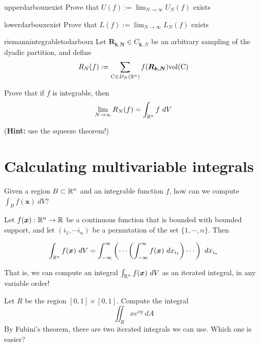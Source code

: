 \begin{problem}{upperdarbouxexist}
    Prove that $U(f) := \lim_{N \to \infty} U_N(f)$ exists 
\end{problem}

\begin{problem}{lowerdarbouxexist}
    Prove that $L(f) := \lim_{N \to \infty} L_N(f)$ exists 
\end{problem}

\begin{problem}{riemannintegrabletodarboux}
    Let $\bm{R_{k,N}} \in C_{\bm{k},N}$ be an arbitrary sampling of the dyadic partition, and define 
    $$R_N(f) := \sum_{C \in D_N(\mathbb{R}^n)} f(\bm{R_{k,N}}) \textnormal{vol(C)}$$
    
    Prove that if $f$ is integrable, then
    $$\lim_{N\to\infty} R_N(f) = \int_{\mathbb{R}^n}f \ dV $$

    (\textbf{Hint:} use the squeeze theorem!)
\end{problem}









\section{Calculating multivariable integrals}

    \begin{motivating}
        Given a region $B \subset \mathbb{R}^n$ and an integrable function $f$, how can we compute $\int_B f(\bm{x}) \ dV$?
    \end{motivating}

    \begin{theorem}[Fubini]
    Let $f(\bm{x}): \mathbb{R}^n \to \mathbb{R}$ be a continuous function that is bounded with bounded support, and let $(i_1, \cdots i_n)$ be a permutation of the set $\{1, \cdots, n\}$. Then 
    
    $$\int_{\mathbb{R}^n} f(\bm{x}) \ dV = \int_{-\infty}^{\infty} \left( \cdots \left(\int_{-\infty}^{\infty} f(\bm{x}) \ dx_{i_1} \right) \cdots \right) \ dx_{i_n}$$

    \end{theorem}

    That is, we can compute an integral $\int_{\mathbb{R}^n} f(\bm{x}) \ dV$ as an iterated integral, in any variable order!

    \begin{example}
        Let $R$ be the region $[0,1] \times [0,1]$.  Compute the integral 
        $$\iint_R xe^{xy} \ dA $$
        By Fubini's theorem, there are two iterated integrals we can use.  Which one is easier?
    \end{example}


